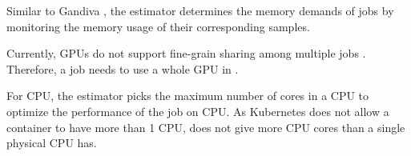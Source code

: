



Similar to Gandiva \cite{gandiva_osdi18}, the estimator determines the memory demands of jobs by monitoring the memory usage of their corresponding samples. 


Currently, GPUs do not support fine-grain sharing among multiple jobs \cite{gandiva_osdi18}.
Therefore, a job needs to use a whole GPU in \name. %

For CPU, the estimator picks the maximum number of cores in a CPU to optimize the performance of the job on CPU.
As Kubernetes does not allow a container to have more than 1 CPU, \name does not give more CPU cores than a single physical CPU has.


